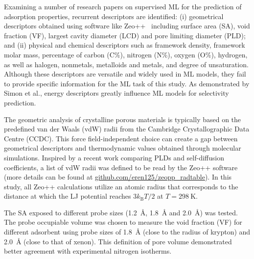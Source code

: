 \documentclass[main]{subfiles}
\begin{document}
Examining a number of research papers on supervised ML for the prediction of adsorption properties,\autocite{Fernandez_2013,Simon_2015,Fanourgakis_2020,Anderson_2020,Pardakhti_2020} recurrent descriptors are identified: (i) geometrical descriptors obtained using software like Zeo++~\autocite{zeopp_Willems2012} including surface area (SA), void fraction (VF), largest cavity diameter (LCD) and pore limiting diameter (PLD); and (ii) physical and chemical descriptors such as framework density, framework molar mass, percentage of carbon (C\%), nitrogen (N\%), oxygen (O\%), hydrogen, as well as halogen, nonmetals, metalloids and metals, and degree of unsaturation. Although these descriptors are versatile and widely used in ML models, they fail to provide specific information for the ML task of this study. As demonstrated by Simon et al., energy descriptors greatly influence ML models for selectivity prediction.

The geometric analysis of crystalline porous materials is typically based on the predefined van der Waals (vdW) radii from the Cambridge Crystallographic Data Centre (CCDC). This force field-independent choice can create a gap between geometrical descriptors and thermodynamic values obtained through molecular simulations. Inspired by a recent work comparing PLDs and self-diffusion coefficients,\autocite{Hung_2021} a list of vdW radii was defined to be read by the Zeo++ software (more details can be found at \url{github.com/eren125/zeopp_radtable}). In this study, all Zeo++ calculations utilize an atomic radius that corresponds to the distance at which the LJ potential reaches $3 k_\text{B} T/2$ at $T = \SI{298}{\kelvin}$.

The SA exposed to different probe sizes (\SI{1.2}{\angstrom}, \SI{1.8}{\angstrom} and \SI{2.0}{\angstrom}) was tested. The probe occupiable volume was chosen to measure the void fraction (VF) for different adsorbent using probe sizes of \SI{1.8}{\angstrom} (close to the radius of krypton) and \SI{2.0}{\angstrom} (close to that of xenon). This definition of pore volume demonstrated better agreement with experimental nitrogen isotherms.\autocite{vol_Ongari2017}
\end{document}
